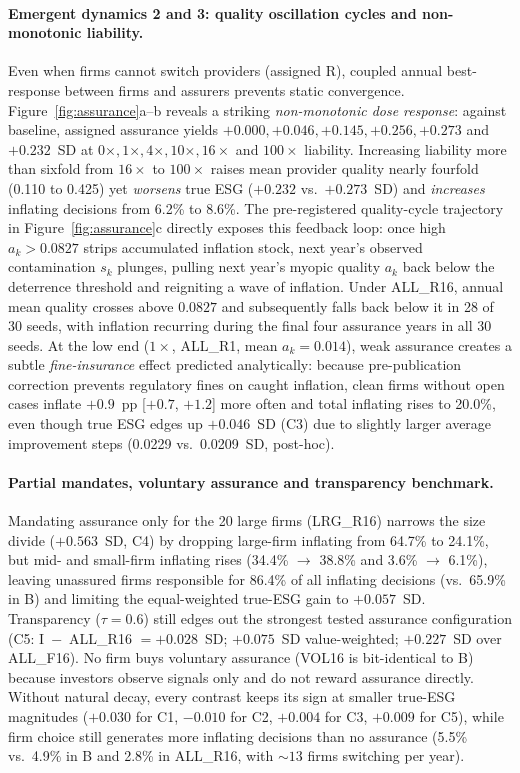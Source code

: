 \documentclass[11pt]{article}
\begin{document}
\paragraph{Emergent dynamics 2 and 3: quality oscillation cycles and non-monotonic liability.}
Even when firms cannot switch providers (assigned R), coupled annual best-response between firms and assurers prevents static convergence. Figure~\ref{fig:assurance}a--b reveals a striking \emph{non-monotonic dose response}: against baseline, assigned assurance yields $+0.000, +0.046, +0.145, +0.256, +0.273$ and $+0.232$~SD at $0\times, 1\times, 4\times, 10\times, 16\times$ and $100\times$ liability. Increasing liability more than sixfold from $16\times$ to $100\times$ raises mean provider quality nearly fourfold (0.110 to 0.425) yet \emph{worsens} true ESG ($+0.232$ vs.\ $+0.273$~SD) and \emph{increases} inflating decisions from 6.2\% to 8.6\%. The pre-registered quality-cycle trajectory in Figure~\ref{fig:assurance}c directly exposes this feedback loop: once high $a_k > 0.0827$ strips accumulated inflation stock, next year's observed contamination $s_k$ plunges, pulling next year's myopic quality $a_k$ back below the deterrence threshold and reigniting a wave of inflation. Under ALL\_R16, annual mean quality crosses above $0.0827$ and subsequently falls back below it in 28 of 30 seeds, with inflation recurring during the final four assurance years in all 30 seeds. At the low end ($1\times$, ALL\_R1, mean $a_k = 0.014$), weak assurance creates a subtle \emph{fine-insurance} effect predicted analytically: because pre-publication correction prevents regulatory fines on caught inflation, clean firms without open cases inflate $+0.9$~pp [$+0.7$, $+1.2$] more often and total inflating rises to 20.0\%, even though true ESG edges up $+0.046$~SD (C3) due to slightly larger average improvement steps (0.0229 vs.\ 0.0209~SD, post-hoc).

\paragraph{Partial mandates, voluntary assurance and transparency benchmark.}
Mandating assurance only for the 20 large firms (LRG\_R16) narrows the size divide ($+0.563$~SD, C4) by dropping large-firm inflating from 64.7\% to 24.1\%, but mid- and small-firm inflating rises (34.4\% $\to$ 38.8\% and 3.6\% $\to$ 6.1\%), leaving unassured firms responsible for 86.4\% of all inflating decisions (vs.\ 65.9\% in B) and limiting the equal-weighted true-ESG gain to $+0.057$~SD. Transparency ($\tau = 0.6$) still edges out the strongest tested assurance configuration (C5: I~$-$~ALL\_R16 $= +0.028$~SD; $+0.075$~SD value-weighted; $+0.227$~SD over ALL\_F16). No firm buys voluntary assurance (VOL16 is bit-identical to B) because investors observe signals only and do not reward assurance directly. Without natural decay, every contrast keeps its sign at smaller true-ESG magnitudes ($+0.030$ for C1, $-0.010$ for C2, $+0.004$ for C3, $+0.009$ for C5), while firm choice still generates more inflating decisions than no assurance (5.5\% vs.\ 4.9\% in B and 2.8\% in ALL\_R16, with $\sim 13$ firms switching per year).
\end{document}
